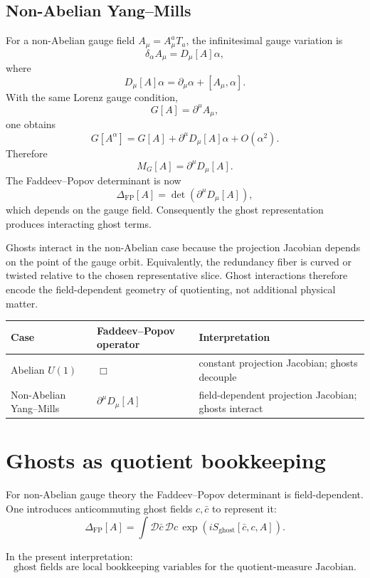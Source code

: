 \documentclass[11pt]{article}
\newcommand{\FP}{\mathrm{FP}}
\begin{document}
\subsection{Non-Abelian Yang--Mills}

For a non-Abelian gauge field \(A_\mu=A_\mu^aT_a\), the infinitesimal gauge variation is
\[
\delta_\alpha A_\mu = D_\mu[A]\alpha ,
\]
where
\[
D_\mu[A]\alpha=\partial_\mu\alpha+[A_\mu,\alpha].
\]
With the same Lorenz gauge condition,
\[
G[A]=\partial^\mu A_\mu,
\]
one obtains
\[
G[A^\alpha]=G[A]+\partial^\mu D_\mu[A]\alpha+O(\alpha^2).
\]
Therefore
\[
M_G[A]=\partial^\mu D_\mu[A].
\]
The Faddeev--Popov determinant is now
\[
\Delta_{\FP}[A]=\det(\partial^\mu D_\mu[A]),
\]
which depends on the gauge field. Consequently the ghost representation produces interacting ghost terms.

\begin{remark}
Ghosts interact in the non-Abelian case because the projection Jacobian depends on the point of the gauge orbit. Equivalently, the redundancy fiber is curved or twisted relative to the chosen representative slice. Ghost interactions therefore encode the field-dependent geometry of quotienting, not additional physical matter.
\end{remark}

\begin{center}
\begin{tabular}{p{}p{}p{}}
\hline
Case & Faddeev--Popov operator & Interpretation\\
\hline
Abelian \(U(1)\) & \(\Box\) & constant projection Jacobian; ghosts decouple\\
Non-Abelian Yang--Mills & \(\partial^\mu D_\mu[A]\) & field-dependent projection Jacobian; ghosts interact\\
\hline
\end{tabular}
\end{center}

\section{Ghosts as quotient bookkeeping}

For non-Abelian gauge theory the Faddeev--Popov determinant is field-dependent. One introduces anticommuting ghost fields \(c,\bar c\) to represent it:
\[
\Delta_{\FP}[A]
=
\int \mathcal D\bar c\,\mathcal Dc\,
\exp\left(iS_{\mathrm{ghost}}[\bar c,c,A]\right).
\]

In the present interpretation:
\[
\boxed{\text{ghost fields are local bookkeeping variables for the quotient-measure Jacobian.}}
\]
\end{document}
